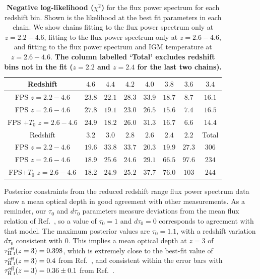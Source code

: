 \begin{table}
	\centering
     \def\arraystretch{1.2}
     \begin{tabular}{|c|c|c|c|c|c|c|c|}
		\hline
		Redshift & $4.6$ & $4.4$ & $4.2$ & $4.0$ & $3.8$ & $3.6$ & $3.4$\\
		\hline
        FPS $z= 2.2-4.6$ & $23.8$ & $22.1$ & $28.3$ & $33.9$ & $18.7$ & $8.7$ & $16.1$ \\
        FPS $z= 2.6-4.6$ & $27.8$ & $19.1$ & $23.0$ & $26.5$ & $15.6$ & $7.4$ & $16.5$\\
        FPS $+ T_0$ $z= 2.6-4.6$ & $24.9$ & $18.2$ & $26.0$ & $31.3$ & $16.7$ & $6.6$ & $14.4$ \\
        \hline
        Redshift & $3.2$ & $3.0$ & $2.8$ & $2.6$ & $2.4$ & $2.2$ & Total \\
		\hline
        FPS $z= 2.2-4.6$ & $19.6$ & $33.8$ & $33.7$ & $20.3$ & $19.9$ & $27.3$ & $306$ \\
        FPS $z= 2.6-4.6$ & $18.9$ & $25.6$ & $24.6$ & $29.1$ & $66.5$ & $97.6$ & $234$ \\
        FPS$ + T_0$ $z= 2.6-4.6$ & $18.2$ & $24.9$ & $25.2$ & $37.7$ & $76.0$ & $103$ & $244$\\
  \hline
	\end{tabular}
    \caption{\label{table:chi2}
    \textbf{Negative log-likelihood ($\chi^2$)} for the flux power spectrum for each redshift bin.
    Shown is the likelihood at the best fit parameters in each chain.
    We show chains fitting to the flux power spectrum only at $z=2.2-4.6$, fitting to the flux power spectrum only at $z=2.6-4.6$, and fitting to the flux power spectrum and IGM temperature at $z=2.6-4.6$.
    \textbf{The column labelled `Total' excludes redshift bins not in the fit ($z=2.2$ and $z=2.4$ for the last two chains).}
    }
\end{table}

Posterior constraints from the reduced redshift range flux power spectrum data show a mean optical depth in good agreement with other measurements.
As a reminder, our $\tau_0$ and $d\tau_0$ parameters measure deviations from the mean flux relation of Ref.~\cite{2007MNRAS.382.1657K}, so a value of $\tau_0=1$ and $d\tau_0=0$ corresponds to agreement with that model.
The maximum posterior values are $\tau_0 = 1.1$, with a redshift variation $d\tau_0$ consistent with $0$.
This implies a mean optical depth at $z=3$ of $\tau^{\text{eff}}_{\text{H~{\sc i}}}(z=3) = 0.398$, which is extremely close to the best-fit value of $\tau^{\text{eff}}_{\text{H~{\sc i}}}(z=3) = 0.4$ from Ref.~\cite{2013MNRAS.430.2067B}, and consistent within the error bars with $\tau^{\text{eff}}_{\text{H~{\sc i}}}(z=3) = 0.36 \pm 0.1$ from Ref.~\cite{2007MNRAS.382.1657K}. 

